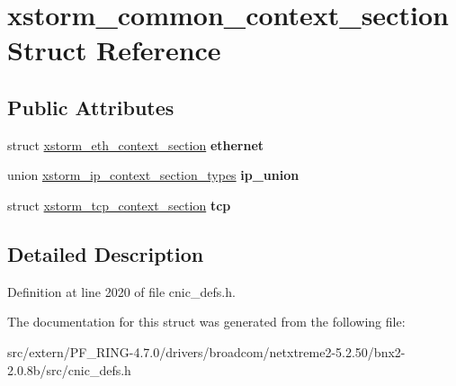 \hypertarget{structxstorm__common__context__section}{
\section{xstorm\_\-common\_\-context\_\-section Struct Reference}
\label{structxstorm__common__context__section}
}
\subsection*{Public Attributes}
\begin{DoxyCompactItemize}
\item 
\hypertarget{structxstorm__common__context__section_a5ef57e83af7669274e9d4994abc05779}{
struct \hyperlink{structxstorm__eth__context__section}{xstorm\_\-eth\_\-context\_\-section} {\bfseries ethernet}}
\label{structxstorm__common__context__section_a5ef57e83af7669274e9d4994abc05779}

\item 
\hypertarget{structxstorm__common__context__section_a8d8634b78362be963df2a9ff8c8ff574}{
union \hyperlink{unionxstorm__ip__context__section__types}{xstorm\_\-ip\_\-context\_\-section\_\-types} {\bfseries ip\_\-union}}
\label{structxstorm__common__context__section_a8d8634b78362be963df2a9ff8c8ff574}

\item 
\hypertarget{structxstorm__common__context__section_a2792d616b7685db0e78473eb2c462da3}{
struct \hyperlink{structxstorm__tcp__context__section}{xstorm\_\-tcp\_\-context\_\-section} {\bfseries tcp}}
\label{structxstorm__common__context__section_a2792d616b7685db0e78473eb2c462da3}

\end{DoxyCompactItemize}


\subsection{Detailed Description}


Definition at line 2020 of file cnic\_\-defs.h.



The documentation for this struct was generated from the following file:\begin{DoxyCompactItemize}
\item 
src/extern/PF\_\-RING-\/4.7.0/drivers/broadcom/netxtreme2-\/5.2.50/bnx2-\/2.0.8b/src/cnic\_\-defs.h\end{DoxyCompactItemize}
